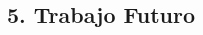 \begin{spacing}{1.5}
\begin{tightcenter}
\section{5. Trabajo Futuro}
\mylinespacing
\end{tightcenter}

\mylinespacing
\mylinespacing
\begin{tightcenter}
\end{tightcenter}
\end{spacing}
